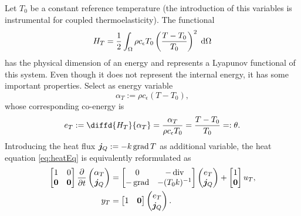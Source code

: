 Let $T_0$ be a constant reference temperature (the introduction of this variables is instrumental for coupled thermoelasticity). The functional 
\begin{equation*}
	H_T = \frac{1}{2} \int_\Omega \rho c_\epsilon T_0 \left(\frac{T-T_0}{T_0} \right)^2 \d\Omega
\end{equation*} 
has the physical dimension of an energy and represents a Lyapunov functional of this system. Even though it does not represent the internal energy, it has some important properties. Select as energy variable 
\begin{equation*}
\alpha_T := \rho c_\epsilon (T-T_0),
\end{equation*}
whose corresponding co-energy is 
\begin{equation*}
	e_T := \diffd{H_T}{\alpha_T} = \frac{\alpha_T}{\rho c_\epsilon T_0} = \frac{T-T_0}{T_0} =: \theta.
\end{equation*}
Introducing the heat flux $\bm{j}_Q := -k \operatorname*{grad} T$ as additional variable, the heat equation \eqref{eq:heatEq} is equivalently reformulated as
\begin{equation}\label{eq:phsysHeat}
\begin{aligned}
\begin{bmatrix}
1 & 0 \\
\bm{0} & \bm{0} \\
\end{bmatrix}
\diffp{}{t}
\begin{pmatrix}
\alpha_T \\
\bm{j}_Q \\
\end{pmatrix} &= 
\begin{bmatrix}
0 & -\div \\
-\grad & -(T_0 k)^{-1} \\
\end{bmatrix}
\begin{pmatrix}
e_T \\
\bm{j}_Q \\
\end{pmatrix} + 
\begin{bmatrix}
1 \\
\bm{0} \\
\end{bmatrix} u_T, \\
y_T &= \begin{bmatrix}
1 & \bm{0} \\
\end{bmatrix} \begin{pmatrix}
e_T \\
\bm{j}_Q \\
\end{pmatrix}.
\end{aligned}
\end{equation}

